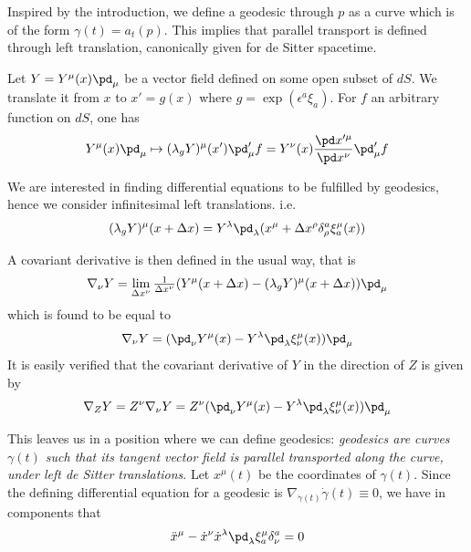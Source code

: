 \documentclass[10pt]{article}
\numberwithin{equation}{section}
\begin{document}
Inspired by the introduction, we define a geodesic through $p$ as 
a curve which is of the form $\gamma(t) = a_t (p)$. This implies 
that parallel transport is defined through left translation, 
canonically given for de Sitter spacetime.

Let $Y=Y^\mu(x) \pd_\mu$ be a vector field defined on some open 
subset of $dS$. We translate it from $x$ to $x' = g(x)$ where $g 
= \exp(\epsilon^a \xi_a)$. For $f$ an arbitrary function on $dS$, 
one has
%
\begin{displaymath}
	Y^\mu(x)\pd_\mu \mapsto (\lambda_g Y)^\mu(x')\pd_\mu' f
	= Y^\nu(x)\frac{\pd x'^\mu}{\pd x^\nu} \pd_\mu' f
\end{displaymath}

We are interested in finding differential equations to be 
fulfilled by geodesics, hence we consider infinitesimal left 
translations. i.e.\
%
\begin{equation}
	(\lambda_g Y)^\mu(x + \Delta x) = Y^\lambda \pd_\lambda (x^\mu 
	+ \Delta x^\rho \delta^a_\rho \xi^\mu_a(x))
\end{equation}

A covariant derivative is then defined in the usual way, that is
%
\begin{displaymath}
	\nabla_\nu Y = \lim_{\Delta x^\nu} \tfrac{1}{\Delta x^\nu} 
	(Y^\mu(x + \Delta x) - (\lambda_g Y)^\mu(x + \Delta x))\pd_\mu
\end{displaymath}
%
which is found to be equal to
%
\begin{equation}
	\nabla_\nu Y = (\pd_\nu Y^\mu(x) - Y^\lambda \pd_\lambda 
	\xi^\mu_\nu(x)) \pd_\mu
\end{equation}
It is easily verified that the covariant derivative of $Y$ in the 
direction of $Z$ is given by
%
\begin{equation}
	\nabla_Z Y = Z^\nu \nabla_\nu Y = Z^\nu (\pd_\nu Y^\mu(x) - 
	Y^\lambda \pd_\lambda \xi^\mu_\nu(x)) \pd_\mu
\end{equation}
%

This leaves us in a position where we can define geodesics: 
\emph{geodesics are curves $\gamma(t)$ such that its tangent 
	vector field is parallel transported along the curve, under 
	left de Sitter translations}. Let $x^\mu(t)$ be the coordinates 
of $\gamma(t)$. Since the defining differential equation for a 
geodesic is $\nabla_{\dot{\gamma}(t)} \dot{\gamma}(t) \equiv 0$, 
we have in components that
%
\begin{equation}\label{eq:geod_ltrans_dS}
	\ddot{x}^\mu - \dot{x}^\nu \dot{x}^\lambda \pd_\lambda 
	\xi^\mu_a \delta^a_\nu = 0
\end{equation}
\end{document}
